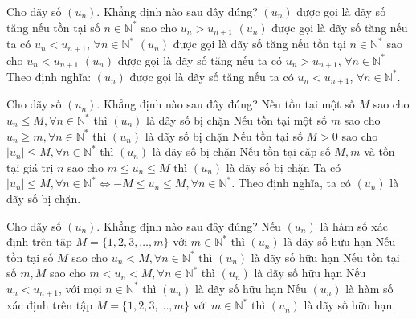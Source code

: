 \begin{ex}%
	Cho dãy số $(u_n)$. Khẳng định nào sau đây đúng?
	\choice
	{$(u_n)$ được gọi là dãy số tăng nếu tồn tại số $n\in\mathbb{N^*}$ sao cho $u_{n}>u_{n+1}$}
	{\True $(u_n)$ được gọi là dãy số tăng nếu ta có $u_n<u_{n+1}$, $\forall n\in\mathbb{N^*}$}
	{$(u_n)$ được gọi là dãy số tăng nếu tồn tại $n\in\mathbb{N^*}$ sao cho $u_n< u_{n+1}$}
	{$(u_n)$ được gọi là dãy số tăng nếu ta có $u_n> u_{n+1}$, $\forall n\in\mathbb{N^*}$}
	\loigiai
	{Theo định nghĩa: $(u_n)$ được gọi là dãy số tăng nếu ta có $u_n<u_{n+1}$, $\forall n\in\mathbb{N^*}$.
	}
\end{ex}

\begin{ex}%
	Cho dãy số $(u_n)$. Khẳng định nào sau đây đúng?
	\choice
	{Nếu tồn tại một số $M$ sao cho $u_n\leq M,\forall n\in\mathbb{N^*}$ thì $(u_n)$ là dãy số bị chặn}
	{Nếu tồn tại một số $m$ sao cho $u_n\geq m, \forall n\in\mathbb{N^*}$ thì $(u_n)$ là dãy số bị chặn}
	{\True Nếu tồn tại số $M>0$ sao cho $|u_n|\leq M,\forall n\in\mathbb{N^*}$ thì $(u_n)$ là dãy số bị chặn}
	{Nếu tồn tại cặp số $M, m$ và tồn tại giá trị $n$ sao cho $m\leq u_n\leq M$ thì $(u_n)$ là dãy số bị chặn}
	\loigiai
	{
		Ta có $|u_n|\leq M,\forall n\in\mathbb{N^*}\Leftrightarrow -M\leq u_n\leq M, \forall n\in\mathbb{N^*}$. Theo định nghĩa, ta có $(u_n)$ là dãy số bị chặn.
	}
\end{ex}

\begin{ex}%
	Cho dãy số $(u_n)$. Khẳng định nào sau đây đúng?
	\choice
	{\True Nếu $(u_n)$ là hàm số xác định trên tập $M=\{1,2,3,\ldots,m\}$ với $m\in\mathbb{N^*}$ thì $(u_n)$ là dãy số hữu hạn}
	{Nếu tồn tại số $M$ sao cho $u_n<M,\forall n\in\mathbb{N^*}$ thì $(u_n)$ là dãy số hữu hạn}
	{Nếu tồn tại số $m, M$ sao cho  $m<u_n<M,\forall n\in\mathbb{N^*}$ thì $(u_n)$ là dãy số hữu hạn}
	{Nếu $u_n<u_{n+1}$, với mọi $n\in\mathbb{N^*}$ thì $(u_n)$ là dãy số hữu hạn}
	\loigiai
	{
		Nếu $(u_n)$ là hàm số xác định trên tập $M=\{1,2,3,\ldots,m\}$ với $m\in\mathbb{N^*}$ thì $(u_n)$ là dãy số hữu hạn.
	}
\end{ex}

